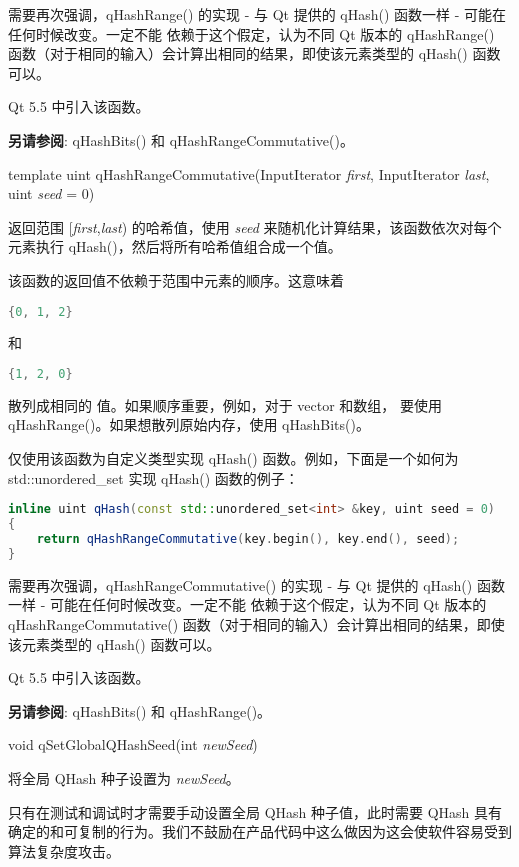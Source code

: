 需要再次强调，qHashRange() 的实现 - 与 Qt 提供的 qHash() 函数一样 - 可能在任何时候改变。一定不能 依赖于这个假定，认为不同 Qt 版本的 qHashRange() 函数（对于相同的输入）会计算出相同的结果，即使该元素类型的 qHash() 函数可以。

Qt 5.5 中引入该函数。

\textbf{另请参阅}: qHashBits() 和 qHashRangeCommutative()。

template uint qHashRangeCommutative(InputIterator \emph{first}, InputIterator \emph{last}, uint \emph{seed} = 0)

返回范围 [\emph{first},\emph{last}) 的哈希值，使用 \emph{seed} 来随机化计算结果，该函数依次对每个元素执行 qHash()，然后将所有哈希值组合成一个值。

该函数的返回值不依赖于范围中元素的顺序。这意味着

\begin{lstlisting}[language=C++]
{0, 1, 2}
\end{lstlisting}

和

\begin{lstlisting}[language=C++]
{1, 2, 0}
\end{lstlisting}

散列成相同的 值。如果顺序重要，例如，对于 vector 和数组， 要使用 qHashRange()。如果想散列原始内存，使用 qHashBits()。

仅使用该函数为自定义类型实现 qHash() 函数。例如，下面是一个如何为
std::unordered\_set 实现 qHash() 函数的例子：

\begin{lstlisting}[language=C++]
inline uint qHash(const std::unordered_set<int> &key, uint seed = 0)
{
    return qHashRangeCommutative(key.begin(), key.end(), seed);
}
\end{lstlisting}

需要再次强调，qHashRangeCommutative() 的实现 - 与 Qt 提供的 qHash() 函数一样 - 可能在任何时候改变。一定不能 依赖于这个假定，认为不同 Qt 版本的 qHashRangeCommutative() 函数（对于相同的输入）会计算出相同的结果，即使该元素类型的 qHash() 函数可以。

Qt 5.5 中引入该函数。

\textbf{另请参阅}: qHashBits() 和 qHashRange()。

void qSetGlobalQHashSeed(int \emph{newSeed})

将全局 QHash 种子设置为 \emph{newSeed}。

只有在测试和调试时才需要手动设置全局 QHash 种子值，此时需要 QHash 具有确定的和可复制的行为。我们不鼓励在产品代码中这么做因为这会使软件容易受到 算法复杂度攻击。

